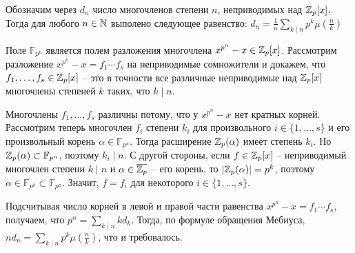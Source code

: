 \Th
	Обозначим через $d_n$ число многочленов степени $n$, неприводимых над $\mathbb{Z}_p[x]$. Тогда для любого $n \in \mathbb{N}$ выполено следующее равенство:
	$d_n = \frac{1}{n}\sum\limits_{k \mid n}p^k\mu\left(\frac {n}{k}\right)$

\Proof
	Поле $\mathbb{F}_{p^n}$ является полем разложения многочлена $x^{p^n} - x \in \mathbb{Z}_p[x]$. Рассмотрим разложение $x^{p^n} - x = f_1\dotsb f_s$ на неприводимые сомножители и докажем, что $f_1, \dotsc, f_s \in \mathbb{Z}_p[x]$ -- это в точности все различные неприводимые над $\mathbb{Z}_p[x]$ многочлены степеней $k$ таких, что $k \mid n$.
	
	Многочлены $f_1, \dotsc, f_s$ различны потому, что у $x^{p^n} - x$ нет кратных корней. Рассмотрим теперь многочлен $f_i$ степени $k_i$ для произвольного $i \in \{1, \dotsc, s\}$ и его произвольный корень $\alpha \in \mathbb{F}_{p^n}$. Тогда расширение $\mathbb{Z}_p(\alpha)$ имеет степень $k_i$. Но $\mathbb{Z}_p(\alpha) \subset \mathbb{F}_{p^n}$, поэтому $k_i \mid n$. С другой стороны, если $f \in \mathbb{Z}_p[x]$ -- неприводимый многочлен степени $k \mid n$ и $\alpha \in \overline{\mathbb{Z}_p}$ -- его корень, то $|\mathbb{Z}_p(\alpha)| = p^k$, поэтому $\alpha \in \mathbb{F}_{p^k} \subset \mathbb{F}_{p^n}$. Значит, $f = f_i$ для некоторого $i \in \{1, \dotsc, s\}$.
	
	Подсчитывая число корней в левой и правой части равенства $x^{p^n} - x = f_1\dotsb f_s$, получаем, что $p^n = \sum\limits_{k \mid n}k d_k$. Тогда, по формуле обращения Мебиуса, $n d_n = \sum_{k \mid n}p^k\mu(\frac{n}{k})$, что и требовалось.
\EndProof

